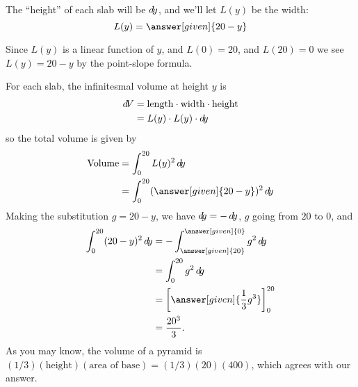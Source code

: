 \documentclass{ximera}
\begin{document}
\begin{example}
\begin{explanation}
\begin{image}
\end{image}
The ``height'' of each slab will be $\mathop{}\!d\! y$, and we'll let $L(y)$ be the width:
\[
L(y) = \answer[given]{20-y}
\]
\begin{hint}
  Since $L(y)$ is a linear function of $y$, and $L(0) = 20$, and
  $L(20) = 0$ we see $L(y) = 20-y$ by the point-slope formula.
\end{hint}
For each slab, the infinitesmal volume at height $y$ is
\begin{align*}
  \mathop{}\!d\! V &= \mathrm{length} \cdot \mathrm{width}\cdot \mathrm{height}\\
  &= L(y)\cdot L(y)\cdot  \mathop{}\!d\! y
\end{align*}
so the total volume is given by
\begin{align*}
  \mathrm{Volume} &= \int_0^{20} L(y)^2 \d y \\
  &= \int_0^{20} (\answer[given]{20-y})^2 \d y
\end{align*}
Making the substitution $g = 20-y $, we have $\mathop{}\!d\! g = - \mathop{}\!d\! y$, $g$ going from $20$ to $0$, and 
	\begin{align*}
	\int_0^{20} (20-y)^2 \d y &= -\int_{\answer[given]{20}}^{\answer[given]{0}} g^2 \d g\\
		&= \int_0^{20} g^2 \d g\\
		&= \eval{\answer[given]{\frac{1}{3} g^3}}_0^{20}\\
		&= \frac{20^3}{3}.
	\end{align*}
As you may know, the volume of a pyramid is
$(1/3)(\text{height})(\text{area of base})=(1/3)(20)(400)$, which
agrees with our answer.
\end{explanation}
\end{example}
\end{document}
